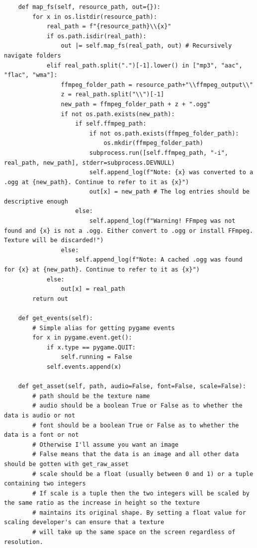 \documentclass{report}
\begin{document}
\begin{verbatim}
    def map_fs(self, resource_path, out={}):
        for x in os.listdir(resource_path):
            real_path = f"{resource_path}\\{x}"
            if os.path.isdir(real_path):
                out |= self.map_fs(real_path, out) # Recursively navigate folders
            elif real_path.split(".")[-1].lower() in ["mp3", "aac", "flac", "wma"]:
                ffmpeg_folder_path = resource_path+"\\ffmpeg_output\\"
                z = real_path.split("\\")[-1]
                new_path = ffmpeg_folder_path + z + ".ogg"
                if not os.path.exists(new_path):
                    if self.ffmpeg_path:
                        if not os.path.exists(ffmpeg_folder_path):
                            os.mkdir(ffmpeg_folder_path)
                        subprocess.run([self.ffmpeg_path, "-i", real_path, new_path], stderr=subprocess.DEVNULL)
                        self.append_log(f"Note: {x} was converted to a .ogg at {new_path}. Continue to refer to it as {x}")
                        out[x] = new_path # The log entries should be descriptive enough
                    else:
                        self.append_log(f"Warning! FFmpeg was not found and {x} is not a .ogg. Either convert to .ogg or install FFmpeg. Texture will be discarded!")
                else:
                    self.append_log(f"Note: A cached .ogg was found for {x} at {new_path}. Continue to refer to it as {x}")
            else:
                out[x] = real_path
        return out

    def get_events(self):
        # Simple alias for getting pygame events
        for x in pygame.event.get():
            if x.type == pygame.QUIT:
                self.running = False
            self.events.append(x)

    def get_asset(self, path, audio=False, font=False, scale=False):
        # path should be the texture name
        # audio should be a boolean True or False as to whether the data is audio or not
        # font should be a boolean True or False as to whether the data is a font or not
        # Otherwise I'll assume you want an image
        # False means that the data is an image and all other data should be gotten with get_raw_asset
        # scale should be a float (usually between 0 and 1) or a tuple containing two integers
        # If scale is a tuple then the two integers will be scaled by the same ratio as the increase in height so the texture
        # maintains its original shape. By setting a float value for scaling developer's can ensure that a texture 
        # will take up the same space on the screen regardless of resolution.


\end{verbatim}
\end{document}
